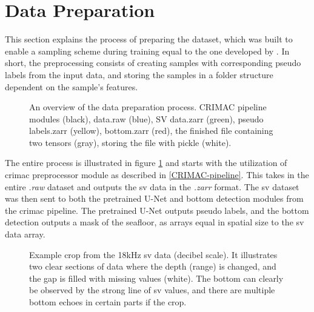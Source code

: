         
    \section{Data Preparation}
        This section explains the process of preparing the dataset, which was built to enable a sampling scheme during training equal to the one developed by \citeauthor{brautaset2020acoustic}\cite{brautaset2020acoustic}. In short, the preprocessing consists of creating samples with corresponding pseudo labels from the input data, and storing the samples in a folder structure dependent on the sample's features.
        
        \clearpage
        \begin{figure}[H]
            \centering
            
            \caption[Data preparation process]{An overview of the data preparation process. CRIMAC pipeline modules (black), data.raw (blue), SV data.zarr (green), pseudo labels.zarr (yellow), bottom.zarr (red), the finished file containing two tensors (gray), storing the file with pickle (white).}
          	\medskip 
            \label{data_generation_flowchart_fig}
        \end{figure}
        
        The entire process is illustrated in figure \ref{data_generation_flowchart_fig} and starts with the utilization of \gls{crimac} preprocessor module as described in \ref{CRIMAC-pipeline}. This takes in the entire \textit{.raw} dataset and outputs the \gls{sv} data in the \textit{.zarr} format. The \gls{sv} dataset was then sent to both the pretrained U-Net and bottom detection modules from the \gls{crimac} pipeline. The pretrained U-Net outputs pseudo labels, and the bottom detection outputs a mask of the seafloor, as arrays equal in spatial size to the \gls{sv} data array.
        
        \begin{figure}[H]
            \centering
            
            \caption[Missing values and bottom]{Example crop from the 18kHz \gls{sv} data (decibel scale). It illustrates two clear sections of data where the depth (range) is changed, and the gap is filled with missing values (white). The bottom can clearly be observed by the strong line of \gls{sv} values, and there are multiple bottom echoes in certain parts if the crop.}
          	\medskip 
            \label{data_bottom_nans_fig}
        \end{figure}
        
